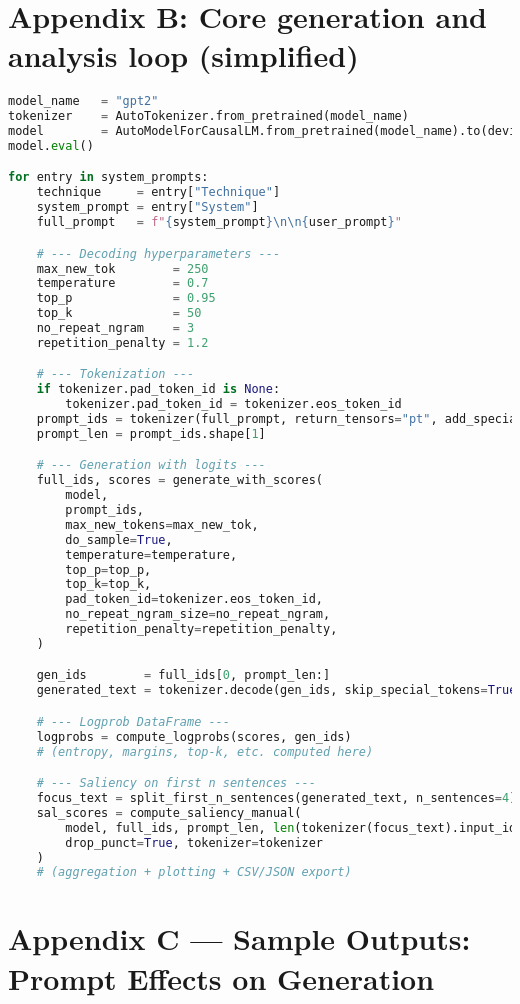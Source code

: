 \documentclass[12pt]{article}
\begin{document}
\section{Appendix B: Core generation and analysis loop (simplified)}
\begin{lstlisting}[language=Python,caption={Core generation and analysis loop (simplified).},label={lst:code}]
model_name   = "gpt2"
tokenizer    = AutoTokenizer.from_pretrained(model_name)
model        = AutoModelForCausalLM.from_pretrained(model_name).to(device)
model.eval()

for entry in system_prompts:
    technique     = entry["Technique"]
    system_prompt = entry["System"]
    full_prompt   = f"{system_prompt}\n\n{user_prompt}"

    # --- Decoding hyperparameters ---
    max_new_tok        = 250
    temperature        = 0.7
    top_p              = 0.95
    top_k              = 50
    no_repeat_ngram    = 3
    repetition_penalty = 1.2

    # --- Tokenization ---
    if tokenizer.pad_token_id is None:
        tokenizer.pad_token_id = tokenizer.eos_token_id
    prompt_ids = tokenizer(full_prompt, return_tensors="pt", add_special_tokens=False).input_ids.to(device)
    prompt_len = prompt_ids.shape[1]

    # --- Generation with logits ---
    full_ids, scores = generate_with_scores(
        model,
        prompt_ids,
        max_new_tokens=max_new_tok,
        do_sample=True,
        temperature=temperature,
        top_p=top_p,
        top_k=top_k,
        pad_token_id=tokenizer.eos_token_id,
        no_repeat_ngram_size=no_repeat_ngram,
        repetition_penalty=repetition_penalty,
    )

    gen_ids        = full_ids[0, prompt_len:]
    generated_text = tokenizer.decode(gen_ids, skip_special_tokens=True)

    # --- Logprob DataFrame ---
    logprobs = compute_logprobs(scores, gen_ids)
    # (entropy, margins, top-k, etc. computed here)

    # --- Saliency on first n sentences ---
    focus_text = split_first_n_sentences(generated_text, n_sentences=4)
    sal_scores = compute_saliency_manual(
        model, full_ids, prompt_len, len(tokenizer(focus_text).input_ids), device,
        drop_punct=True, tokenizer=tokenizer
    )
    # (aggregation + plotting + CSV/JSON export)
\end{lstlisting}


\appendix
\section*{Appendix C — Sample Outputs: Prompt Effects on Generation}
\end{document}
